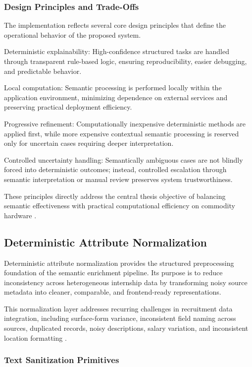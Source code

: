 \subsubsection*{Design Principles and Trade-Offs}

The implementation reflects several core design principles that define the operational behavior of the proposed system.

Deterministic explainability: High-confidence structured tasks are handled through transparent rule-based logic, ensuring reproducibility, easier debugging, and predictable behavior.

Local computation: Semantic processing is performed locally within the application environment, minimizing dependence on external services and preserving practical deployment efficiency.

Progressive refinement: Computationally inexpensive deterministic methods are applied first, while more expensive contextual semantic processing is reserved only for uncertain cases requiring deeper interpretation.

Controlled uncertainty handling: Semantically ambiguous cases are not blindly forced into deterministic outcomes; instead, controlled escalation through semantic interpretation or manual review preserves system trustworthiness.

These principles directly address the central thesis objective of balancing semantic effectiveness with practical computational efficiency on commodity hardware \cite{schwartz2020green, menghani2023efficient}.

\subsection{Deterministic Attribute Normalization}

Deterministic attribute normalization provides the structured preprocessing foundation of the semantic enrichment pipeline. Its purpose is to reduce inconsistency across heterogeneous internship data by transforming noisy source metadata into cleaner, comparable, and frontend-ready representations.

This normalization layer addresses recurring challenges in recruitment data integration, including surface-form variance, inconsistent field naming across sources, duplicated records, noisy descriptions, salary variation, and inconsistent location formatting \cite{doan2012principles, chu2016data, sarawagi2008information}.

\subsubsection*{Text Sanitization Primitives}

